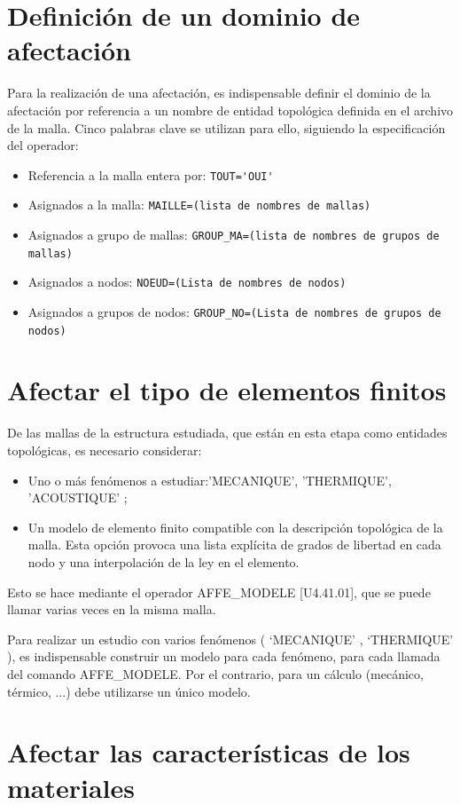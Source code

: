 \documentclass[12pt]{book}
\theoremstyle{definition}
\theoremstyle{remark}
\theoremstyle{plain}
\begin{document}
\section{Definición de un dominio de afectación}

Para la realización de una afectación, es indispensable definir el dominio de la afectación
por referencia a un nombre de entidad topológica definida en el archivo de la malla. Cinco palabras clave 
se utilizan para ello, siguiendo la especificación del operador:

\begin{itemize}
 \item Referencia a la malla entera por: \verb|TOUT='OUI'|
 \item Asignados a la malla: \verb|MAILLE=(lista de nombres de mallas)|
 \item Asignados a grupo de mallas: \verb|GROUP_MA=(lista de nombres de grupos de mallas)|
 \item Asignados a nodos: \verb|NOEUD=(Lista de nombres de nodos)|
 \item Asignados a grupos de nodos: \verb|GROUP_NO=(Lista de nombres de grupos de nodos)|
\end{itemize}

\section{Afectar el tipo de elementos finitos}

De las mallas de la estructura estudiada, que están en esta etapa como 
entidades topológicas, es necesario considerar:
\begin{itemize}
 \item Uno o más fenómenos a estudiar:'MECANIQUE', 'THERMIQUE', 'ACOUSTIQUE' ;
 \item Un modelo de elemento finito compatible con la descripción
topológica de la malla. Esta opción provoca una lista explícita de grados 
de libertad en cada nodo y una interpolación de la ley en el elemento.
\end{itemize}
Esto se hace mediante el operador AFFE\_MODELE [U4.41.01], que se puede 
llamar varias veces en la misma malla.

Para realizar un estudio con varios fenómenos ( ‘MECANIQUE’ , ‘THERMIQUE’ ),
es indispensable construir un modelo para cada fenómeno, para cada
llamada del comando AFFE\_MODELE. Por el contrario, para un cálculo (mecánico,
térmico, ...) debe utilizarse un único modelo.

\section{Afectar las características de los materiales}
\end{document}
